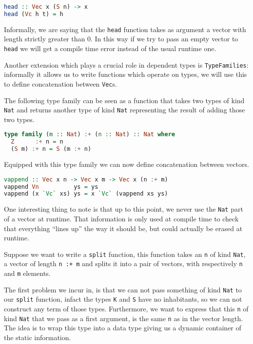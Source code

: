 \documentclass[11pt]{article}
\begin{document}
\begin{lstlisting}[language=haskell]
head :: Vec x (S n) -> x
head (Vc h t) = h
\end{lstlisting}

Informally, we are saying that the \texttt{head} function takes as
argument a vector with length strictly greater than 0. In this way if we
try to pass an empty vector to \texttt{head} we will get a compile time
error instead of the usual runtime one.

Another extension which plays a crucial role in dependent types is
\texttt{TypeFamilies}: informally it allows us to write functions which operate on types, 
we will use this to define concatenation between \texttt{Vec}s.

The following type family can be seen as a function that takes two types
of kind \texttt{Nat} and returns another type of kind \texttt{Nat}
representing the result of adding those two types.

\begin{lstlisting}[language=haskell]
type family (m :: Nat) :+ (n :: Nat) :: Nat where
  Z      :+ n = n
  (S m) :+ n = S (m :+ n)
\end{lstlisting}

Equipped with this type family we can now define concatenation between
vectors.

\begin{lstlisting}[language=haskell]
vappend :: Vec x n -> Vec x m -> Vec x (n :+ m)
vappend Vn          ys = ys
vappend (x `Vc` xs) ys = x `Vc` (vappend xs ys)
\end{lstlisting}

One interesting thing to note is that up to this point, we never use the
\texttt{Nat} part of a vector at runtime. That information is only used
at compile time to check that everything ``lines up'' the way it should
be, but could actually be erased at runtime.

Suppose we want to write a \texttt{split} function, this function takes
an \texttt{n} of kind \texttt{Nat}, a vector of length \texttt{n\ :+\ m}
and splits it into a pair of vectors, with respectively \texttt{n} and
\texttt{m} elements.

The first problem we incur in, is that we can not pass something of kind
\texttt{Nat} to our \texttt{split} function, infact the types \texttt{K} and \texttt{S} have no inhabitants, so we can
not construct any term of those types. Furthermore, we want to
express that this \texttt{n} of kind \texttt{Nat} that we pass as a
first argument, is the same \texttt{n} as in the vector length. The idea is to 
wrap this type into a data type giving us a dynamic container of the static 
information.
\end{document}
